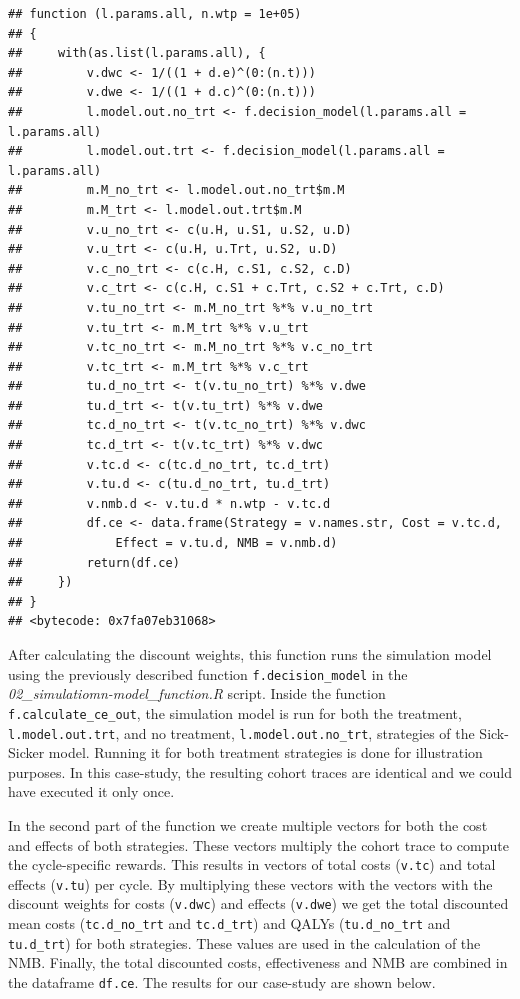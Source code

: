\documentclass[]{article}
\begin{document}
\begin{verbatim}
## function (l.params.all, n.wtp = 1e+05) 
## {
##     with(as.list(l.params.all), {
##         v.dwc <- 1/((1 + d.e)^(0:(n.t)))
##         v.dwe <- 1/((1 + d.c)^(0:(n.t)))
##         l.model.out.no_trt <- f.decision_model(l.params.all = l.params.all)
##         l.model.out.trt <- f.decision_model(l.params.all = l.params.all)
##         m.M_no_trt <- l.model.out.no_trt$m.M
##         m.M_trt <- l.model.out.trt$m.M
##         v.u_no_trt <- c(u.H, u.S1, u.S2, u.D)
##         v.u_trt <- c(u.H, u.Trt, u.S2, u.D)
##         v.c_no_trt <- c(c.H, c.S1, c.S2, c.D)
##         v.c_trt <- c(c.H, c.S1 + c.Trt, c.S2 + c.Trt, c.D)
##         v.tu_no_trt <- m.M_no_trt %*% v.u_no_trt
##         v.tu_trt <- m.M_trt %*% v.u_trt
##         v.tc_no_trt <- m.M_no_trt %*% v.c_no_trt
##         v.tc_trt <- m.M_trt %*% v.c_trt
##         tu.d_no_trt <- t(v.tu_no_trt) %*% v.dwe
##         tu.d_trt <- t(v.tu_trt) %*% v.dwe
##         tc.d_no_trt <- t(v.tc_no_trt) %*% v.dwc
##         tc.d_trt <- t(v.tc_trt) %*% v.dwc
##         v.tc.d <- c(tc.d_no_trt, tc.d_trt)
##         v.tu.d <- c(tu.d_no_trt, tu.d_trt)
##         v.nmb.d <- v.tu.d * n.wtp - v.tc.d
##         df.ce <- data.frame(Strategy = v.names.str, Cost = v.tc.d, 
##             Effect = v.tu.d, NMB = v.nmb.d)
##         return(df.ce)
##     })
## }
## <bytecode: 0x7fa07eb31068>
\end{verbatim}

After calculating the discount weights, this function runs the
simulation model using the previously described function
\texttt{f.decision\_model} in the
\emph{02\_simulatiomn-model\_function.R} script. Inside the function
\texttt{f.calculate\_ce\_out}, the simulation model is run for both the
treatment, \texttt{l.model.out.trt}, and no treatment,
\texttt{l.model.out.no\_trt}, strategies of the Sick-Sicker model.
Running it for both treatment strategies is done for illustration
purposes. In this case-study, the resulting cohort traces are identical
and we could have executed it only once.

In the second part of the function we create multiple vectors for both
the cost and effects of both strategies. These vectors multiply the
cohort trace to compute the cycle-specific rewards. This results in
vectors of total costs (\texttt{v.tc}) and total effects (\texttt{v.tu})
per cycle. By multiplying these vectors with the vectors with the
discount weights for costs (\texttt{v.dwc}) and effects (\texttt{v.dwe})
we get the total discounted mean costs (\texttt{tc.d\_no\_trt} and
\texttt{tc.d\_trt}) and QALYs (\texttt{tu.d\_no\_trt} and
\texttt{tu.d\_trt}) for both strategies. These values are used in the
calculation of the NMB. Finally, the total discounted costs,
effectiveness and NMB are combined in the dataframe \texttt{df.ce}. The
results for our case-study are shown below.
\end{document}
